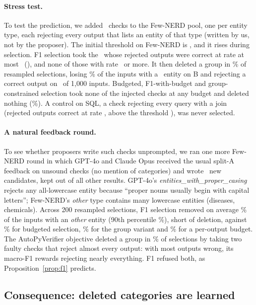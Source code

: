 \documentclass[11pt]{article}
\begin{document}
\paragraph{Stress test.} To test the prediction, we added \injNFewnerd\
checks to the Few-NERD pool, one per entity type, each rejecting every
output that lists an entity of that type (written by us, not by the
proposer). The initial threshold on Few-NERD is \thrFewnerd, and it rises
during selection. F1 selection took the \injNPicked\ whose rejected outputs were
correct at rate at most \injPrecPickedMax\ (\injPicked), and none of those
with rate \injPrecUnpickedMin\ or more. It then deleted a group in
\injDelFone\% of resampled selections, losing \injWipedFone\% of the
inputs with a \injWipedGroupFone\ entity on B and rejecting a correct output on
\injGammaKFone\ of 1{,}000 inputs. Budgeted, F1-with-budget and
group-constrained selection took none of the injected checks at any budget
and deleted nothing (\injDelBudget\%). A control on SQL, a check
rejecting every query with a join (rejected outputs correct at rate
\injPrecSQL, above the threshold \thrSQL), was never selected.

\paragraph{A natural feedback round.} To see whether proposers write such
checks unprompted, we ran one more Few-NERD round in which GPT-4o and
Claude Opus received the usual split-A feedback on unsound checks (no
mention of categories) and wrote \eNnew\ new candidates, kept out of all
other results. GPT-4o's \emph{entities\_with\_proper\_casing} rejects any
all-lowercase entity because ``proper nouns usually begin with capital
letters''; Few-NERD's \emph{other} type contains many lowercase entities
(diseases, chemicals). Across 200 resampled selections, F1 selection
removed on average \eOtherFone\% of the inputs with an \emph{other}
entity (90th percentile \eOtherPnineFone\%), short of deletion,
against \eOtherBudget\% for budgeted selection, \eOtherGroup\% for the
group variant and \eOtherOutlvl\% for a per-output budget. The
AutoPyVerifier objective deleted a group in \eDelApv\% of selections by
taking two faulty checks that reject almost every output:
with most outputs wrong, its macro-F1 rewards rejecting nearly everything.
F1 refused both, as Proposition~\ref{prop:f1} predicts.

\subsection{Consequence: deleted categories are learned}\label{sec:downstream}
\end{document}
